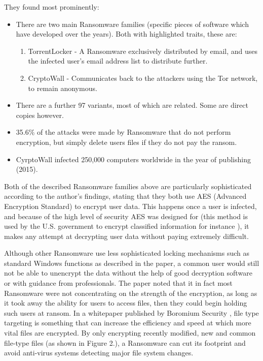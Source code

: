 \documentclass[journal,comsoc]{IEEEtran}
\begin{document}
They found most prominently:
\begin{itemize}
\item There are two main Ransomware families (specific pieces of software which have developed over the years). Both with highlighted traits, these are:
\begin{enumerate}
\item TorrentLocker - A Ransomware exclusively distributed by email, and uses the infected user's email address list to distribute further.
\item CryptoWall - Communicates back to the attackers using the Tor network, to remain anonymous.
\end{enumerate}
\item There are a further 97 variants, most of which are related. Some are direct copies however.
\item 35.6\% of the attacks were made by Ransomware that do not perform encryption, but simply delete users files if they do not pay the ransom.
\item CyrptoWall infected 250,000 computers worldwide in the year of publishing (2015).
\end{itemize}Both of the described Ransomware families above are particularly sophisticated according to the author's findings, stating that they both use AES (Advanced Encryption Standard) to encrypt user data. This happens once a user is infected, and because of the high level of security AES was designed for (this method is used by the U.S. government to encrypt classified information for instance \cite{aes}), it makes any attempt at decrypting user data without paying extremely difficult. \par
Although other Ransomware use less sophisticated locking mechanisms such as standard Windows functions as described in the paper, a common user would still not be able to unencrypt the data without the help of good decryption software or with guidance from professionals. The paper noted that it in fact most Ransomware were not concentrating on the strength of the encryption, as long as it took away the ability for users to access files, then they could begin holding such users at ransom. In a whitepaper published by Boromium Security \cite{bromium}, file type targeting is something that can increase the efficiency and speed at which more vital files are encrypted. By only encrypting recently modified, new and common file-type files (as shown in Figure 2.), a Ransomware can cut its footprint and avoid anti-virus systems detecting major file system changes.
\end{document}
